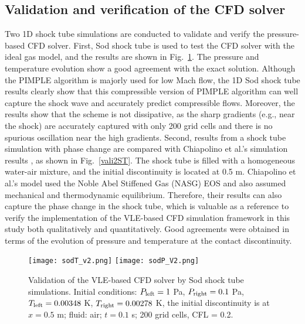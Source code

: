     \subsection{Validation and verification of the CFD solver} \label{App:vali:CFD}
    Two 1D shock tube simulations are conducted to validate and verify the pressure-based CFD solver. First, Sod shock tube \cite{sod1978survey} is used to test the CFD solver with the ideal gas model, and the results are shown in Fig.~\ref{vali1ST}. The pressure and temperature evolution show a good agreement with the exact solution. Although the PIMPLE algorithm is majorly used for low Mach flow, the 1D Sod shock tube results clearly show that this compressible version of PIMPLE algorithm can well capture the shock wave and accurately predict compressible flows. Moreover, the results show that the scheme is not dissipative, as the sharp gradients (e.g., near the shock) are accurately captured with only 200 grid cells and there is no spurious oscillation near the high gradients. Second, results from a shock tube simulation with phase change are compared with Chiapolino et al.'s simulation results \cite{chiapolino2017simple}, as shown in Fig.~\ref{vali2ST}. The shock tube is filled with a homogeneous water-air mixture, and the initial discontinuity is located at 0.5 m. Chiapolino et al.'s model used the Noble Abel Stiffened Gas (NASG) EOS and also assumed mechanical and thermodynamic equilibrium. Therefore, their results can also capture the phase change in the shock tube, which is valuable as a reference to verify the implementation of the VLE-based CFD simulation framework in this study both qualitatively and quantitatively. Good agreements were obtained in terms of the evolution of pressure and temperature at the contact discontinuity.
    \begin{figure}[htbp]

            \texttt{[image: sodT\_v2.png]}
            \texttt{[image: sodP\_V2.png]}

        \caption{Validation of the VLE-based CFD solver by Sod shock tube simulations. Initial conditions: $P_{\rm{left}} = 1$ Pa, $P_{\rm{right}} = 0.1$ Pa, $T_{\rm{left}} = 0.00348$ K, $T_{\rm{right}} = 0.00278$ K, the initial discontinuity is at $x=0.5$ m; fluid: air; $t=0.1$ s; 200 grid cells, CFL = 0.2.}
        \label{vali1ST}
    \end{figure}
    
